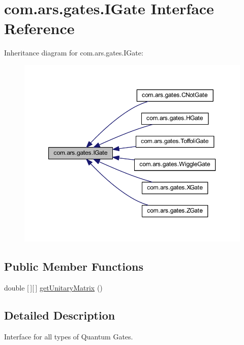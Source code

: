 \hypertarget{interfacecom_1_1ars_1_1gates_1_1_i_gate}{}\section{com.\+ars.\+gates.\+I\+Gate Interface Reference}
\label{interfacecom_1_1ars_1_1gates_1_1_i_gate}


Inheritance diagram for com.\+ars.\+gates.\+I\+Gate\+:\nopagebreak
\begin{figure}[H]
\begin{center}
\leavevmode
\includegraphics[width=350pt]{interfacecom_1_1ars_1_1gates_1_1_i_gate__inherit__graph}
\end{center}
\end{figure}
\subsection*{Public Member Functions}
\begin{DoxyCompactItemize}
\item 
double \mbox{[}$\,$\mbox{]}\mbox{[}$\,$\mbox{]} \hyperlink{interfacecom_1_1ars_1_1gates_1_1_i_gate_a6a940b3a6940cd97429aa211143121cb}{get\+Unitary\+Matrix} ()
\end{DoxyCompactItemize}


\subsection{Detailed Description}
Interface for all types of Quantum Gates. 

